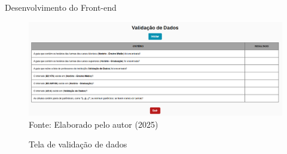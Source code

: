 \begin{frame}{Desenvolvimento do Front-end}
    \begin{figure}
        \centering
        \vspace{-0.5cm}
        \caption{Tela de validação de dados}
        \vspace{-0.2cm}
        \includegraphics[width=1\textwidth]{figuras/front-10.png}
        \\ %
        \footnotesize Fonte: Elaborado pelo autor (2025)
    \end{figure}
\end{frame}

